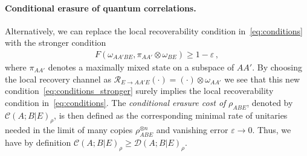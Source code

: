 \documentclass[a4paper,aps,prl,twocolumn,10pt,superscriptaddress]{revtex4-1}
\theoremstyle{plain}
\theoremstyle{definition}
\begin{document}

\paragraph{Conditional erasure of quantum correlations.} Alternatively, we can replace the local recoverability condition in~\eqref{eq:conditions} with the stronger condition
\begin{align}\label{eq:conditions_stronger}
F(\omega_{AA'BE},\pi_{AA'}\otimes\omega_{BE})\geq1-\varepsilon\,,
\end{align}
where $\pi_{AA'}$ denotes a maximally mixed state on a subspace of $AA'$. By choosing the local recovery channel as $\mathcal{R}_{E\rightarrow AA'E}(\cdot)=(\cdot)\otimes\omega_{AA'}$ we see that this new condition~\eqref{eq:conditions_stronger} surely implies the local recoverability condition in~\eqref{eq:conditions}. The {\it conditional erasure cost of} $\rho_{ABE}$, denoted by $\mathcal{C}(A;B|E)_\rho$, is then defined as the corresponding minimal rate of unitaries needed in the limit of many copies $\rho_{ABE}^{\otimes n}$ and vanishing error $\varepsilon\to0$. Thus, we have by definition $\mathcal{C}(A;B|E)_\rho\geq\mathcal{D}(A;B|E)_\rho$.

\end{document}
